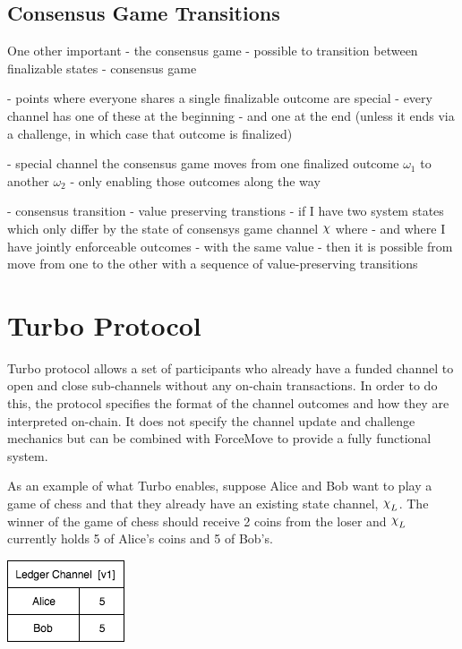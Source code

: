 \documentclass{article}
\DeclareRobustCommand{\rchi}{{\mathpalette\irchi\relax}}
\newcommand{\irchi}[2]{\raisebox{\depth}{$#1\chi$}} %
\theoremstyle{definition}
\begin{document}
\subsection{Consensus Game Transitions}

One other important 
- the consensus game
- possible to transition between finalizable states
- consensus game

- points where everyone shares a single finalizable outcome are special
- every channel has one of these at the beginning
- and one at the end (unless it ends via a challenge, in which case that outcome is finalized)

- special channel the consensus game moves from one finalized outcome $\omega_1$ to another $\omega_2$
- only enabling those outcomes along the way

- consensus transition
- value preserving transtions
- if I have two system states which only differ by the state of consensys game channel $\rchi$ where 
- and where I have jointly enforceable outcomes 
- with the same value
- then it is possible from move from one to the other with a sequence of value-preserving transitions


\section{Turbo Protocol}

Turbo protocol allows a set of participants who already have a funded channel to open and
close sub-channels without any on-chain transactions. 
In order to do this, the protocol specifies the format of the channel outcomes and how
they are interpreted on-chain.
It does not specify the channel update and challenge mechanics but can be combined with
ForceMove to provide a fully functional system.

As an example of what Turbo enables, suppose Alice and Bob want to play a game of chess and that
they already have an existing state channel, $\rchi_L$.
The winner of the game of chess should receive 2 coins from the loser and $\rchi_L$ currently holds
5 of Alice's coins and 5 of Bob's.

\begin{center}
  \includegraphics[scale=0.5]{turbo_start} %
\end{center}
\end{document}
